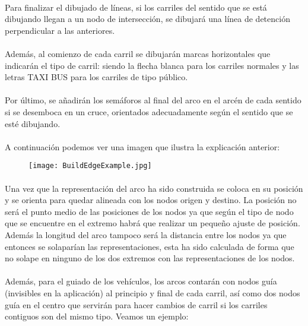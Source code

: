 	\paragraph{}
	Para finalizar el dibujado de líneas, si los carriles del sentido que se está dibujando llegan a un nodo de intersección, se dibujará una línea de detención perpendicular a las anteriores.
	\paragraph{}
	Además, al comienzo de cada carril se dibujarán marcas horizontales que indicarán el tipo de carril: siendo la flecha blanca para los carriles normales y las letras TAXI BUS para los carriles de tipo público.
	\paragraph{}
	Por último, se añadirán los semáforos al final del arco en el arcén de cada sentido si se desemboca en un cruce, orientados adecuadamente según el sentido que se esté dibujando.
	\paragraph{}
	A continuación podemos ver una imagen que ilustra la explicación anterior:
	
	\begin{figure}[H]
		\centering
			\texttt{[image: BuildEdgeExample.jpg]}
	\end{figure}
	
	\paragraph{}
	Una vez que la representación del arco ha sido construida se coloca en su posición y se orienta para quedar alineada con los nodos origen y destino. La posición no será el punto medio de las posiciones de los nodos ya que según el tipo de nodo que se encuentre en el extremo habrá que realizar un pequeño ajuste de posición. Además la longitud del arco tampoco será la distancia entre los nodos ya que entonces se solaparían las representaciones, esta ha sido calculada de forma que no solape en ninguno de los dos extremos con las representaciones de los nodos.
	
	\paragraph{}
	Además, para el guiado de los vehículos, los arcos contarán con nodos guía (invisibles en la aplicación) al principio y final de cada carril, así como dos nodos guía en el centro que servirán para hacer cambios de carril si los carriles contiguos son del mismo tipo. Veamos un ejemplo:
	
